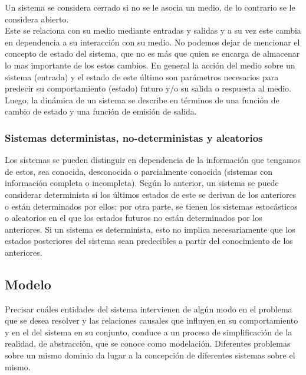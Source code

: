 Un sistema se considera cerrado si no se le asocia un medio, de lo contrario se le considera abierto. \parencite{temasdesimulacion}\\ Este se relaciona con su medio mediante entradas y salidas y a su vez este cambia en dependencia a su interacción con su medio.
No podemos dejar de mencionar el concepto de estado del sistema, que no es más que quien se encarga de almacenar lo mas importante de los estos cambios.
En general la acción del medio sobre un sistema (entrada) y el estado de este último son parámetros necesarios para predecir su comportamiento (estado) futuro y/o su salida o respuesta al medio. Luego, la dinámica de un sistema se describe en términos de una función de cambio de estado y una función de emisión de salida. \parencite{temasdesimulacion}\\

\subsubsection{Sistemas deterministas, no-deterministas y aleatorios}

Los sistemas se pueden distinguir en dependencia de la información que tengamos de estos, sea conocida, desconocida o parcialmente conocida (sistemas con información completa o incompleta).
Según lo anterior, un sistema se puede considerar determinista si los últimos estados de este se derivan de los anteriores o están determinados por ellos; por otra parte, se tienen los sistemas estocásticos o aleatorios en el que los estados futuros no están determinados por los anteriores.
Si un sistema es determinista, esto no implica necesariamente que los estados posteriores del sistema sean predecibles a partir del conocimiento de los anteriores. \parencite{darling_deterministic_nodate}

\subsection{Modelo}

Precisar cuáles entidades del sistema intervienen de algún modo en el problema que se desea resolver y las relaciones causales que influyen en su comportamiento y en el del sistema en su conjunto, conduce a un proceso de simplificación de la realidad, de abstracción, que se conoce como modelación.
Diferentes problemas sobre un mismo dominio da lugar a la concepción de diferentes sistemas sobre el mismo.\\

